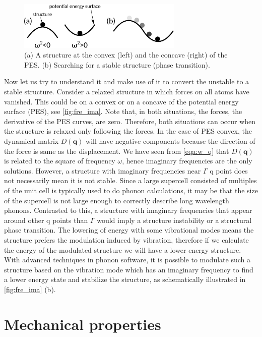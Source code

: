 \begin{figure}[htbp!] 
\centering  
\includegraphics[width=0.7\textwidth]{fre_ima.eps}
\caption{ (a) A structure at the convex (left) and the concave (right) of the PES. (b) Searching for a stable structure (phase transition).}  
\label{fig:fre_ima}
\end{figure} 

Now let us try to understand it and make use of it to convert the unstable to a stable structure. Consider a relaxed structure in which forces on all atoms have vanished. This could be on a convex or on a concave of the potential energy surface (PES), see \autoref{fig:fre_ima}. Note that, in both situations, the forces, the derivative of the PES curves, are zero. Therefore, both situations can occur when the structure is relaxed only following the forces. In the case of PES convex, the dynamical matrix $D(\mathbf{q})$ will have negative components because the direction of the force is same as the displacement. We have seen from \autoref{eqa:w_q} that $D(\mathbf{q})$ is related to the square of frequency $\omega$, hence imaginary frequencies are the only solutions. However, a structure with imaginary frequencies near $\Gamma$ q point does not necessarily mean it is not stable. Since a large supercell consisted of multiples of the unit cell is typically used to do phonon calculations, it may be that the size of the supercell is not large enough to correctly describe long wavelength phonons. Contrasted to this, a structure with imaginary frequencies that appear around other q points than $\Gamma$ would imply a structure instability or a structural phase transition. The lowering of energy with some vibrational modes means the structure prefers the modulation induced by vibration, therefore if we calculate the energy of the modulated structure we will have a lower energy structure. With advanced techniques in phonon software\cite[e.g.][]{Togo20151}, it is possible to modulate such a structure based on the vibration mode which has an imaginary frequency to find a lower energy state and stabilize the structure, as schematically illustrated in \autoref{fig:fre_ima} (b). 



\section{Mechanical properties}

